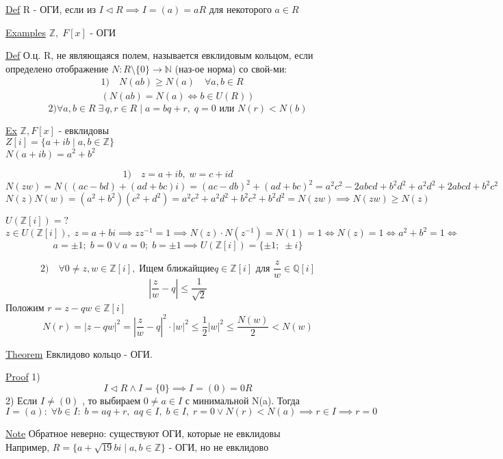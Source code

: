 \documentclass[a4paper]{article}
\begin{document}
\underline{Def} R - ОГИ, если из $ I \lhd R \implies I = (a) = aR $ для некоторого
$ a \in R $ 

\underline{Examples} $ \mathbb{Z}, \; F[x] $ - ОГИ

\underline{Def} О.ц. R, не являющаяся полем, называется евклидовым кольцом, если
определено отображение $ N: R \setminus \{0\} \to \mathbb{N} $ (наз-ое норма) со
свой-ми: \\
\begin{equation*}
    \begin{aligned}
        1) \quad N(ab) \geq N(a) \quad \forall a,b \in R\\
        ( N(ab) = N(a) \iff b \in U(R) )
    \end{aligned}
\end{equation*}
\[
    2) \forall a,b \in R \; \exists \, q,r \in R \; | \; a = bq + r, \; q = 0
    \text{ или } N(r) < N(b)
\]

\underline{Ex} $ \mathbb{Z}, F[x] $ - евклидовы \\
$ Z[i] = \{ a+ib \; | \; a,b \in \mathbb{Z} \}  $ \\
$ N(a + ib) = a^2 + b^2 $ 

\[
    1) \quad z = a + ib, \; w = c + id
\]
\[
    N(zw)= N((ac - bd) + (ad + bc)i) = ( ac - db)^2 + (ad + bc)^2 = a^2 c^2 - 2a
    bcd + b^2d^2 + a^2d^2 + 2abcd + b^2c^2
\]
\[
    N(z)N(w) = (a^2 + b^2)(c^2 + d^2) = a^2c^2 + a^2d^2 + b^2c^2 + b^2d^2 = N(zw)
    \implies N(zw) \geq N(z)
\]

$ U(\mathbb{Z}[i]) = ? $ 
\[
    z \in U(\mathbb{Z}[i]), \; z = a + bi \implies z z^{-1} = 1  \implies
    N(z) \cdot N(z^{-1}) = N(1) = 1 \iff N(z) = 1 \iff a^2 + b^2 = 1 \iff
\]
\[
    a = \pm 1; \; b = 0 \lor a = 0; \; b = \pm 1 \implies U(\mathbb{Z}[i]) = 
    \{ \pm 1; \; \pm i \}
\]

\[
    2) \quad \forall 0 \neq  z, w \in \mathbb{Z}[i], \; \text{Ищем ближайщие}
    q \in \mathbb{Z}[i] \text{ для } \frac{z}{w} \in \mathbb{Q}[i]
\]
\[
    \left| \frac{z}{w} - q \right| \leq \frac{1}{\sqrt{2}} 
\]
Положим $ r = z -qw \in \mathbb{Z}[i] $ 
\[
    N(r) = |z-qw|^2 = \left| \frac{z}{w} - q \right|^2 \cdot |w|^2 \leq 
    \frac{1}{2} |w|^2 \leq \frac{N(w)}{2} < N(w)
\]

\begin{tcolorbox}
    \underline{Theorem} Евклидово кольцо - ОГИ.

    \underline{Proof} 1)
    \[
        I \lhd R \land I = \{0\} \implies I = (0) = 0R
    \]
    2) Если $ I \neq (0) $ , то выбираем $ 0 \neq a \in I $ с минимальной N(a). Тогда
    $ I = (a): \; \forall b \in I: \; b = aq + r, \; aq \in I, \; b \in I, \;
    r = 0 \lor N(r) < N(a) \implies r \in I \implies r = 0$ 
\end{tcolorbox}

\underline{Note} Обратное неверно: существуют ОГИ, которые не евклидовы\\
Например, $ R = \{ a + \sqrt{19}bi  \; | \; a,b \in \mathbb{Z} \} $ - ОГИ, но
не евклидово
\end{document}
